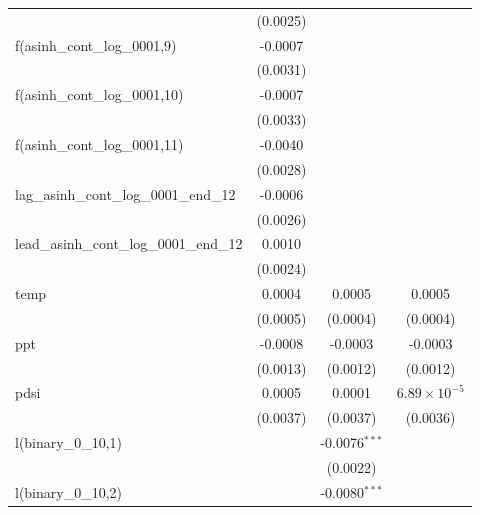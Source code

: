 \begin{tabular}{lccc}
                                               & (0.0025) &                        &   \\   
   f(asinh\_cont\_log\_0001,9)                 & -0.0007  &                        &   \\   
                                               & (0.0031) &                        &   \\   
   f(asinh\_cont\_log\_0001,10)                & -0.0007  &                        &   \\   
                                               & (0.0033) &                        &   \\   
   f(asinh\_cont\_log\_0001,11)                & -0.0040  &                        &   \\   
                                               & (0.0028) &                        &   \\   
   lag\_asinh\_cont\_log\_0001\_end\_12        & -0.0006  &                        &   \\   
                                               & (0.0026) &                        &   \\   
   lead\_asinh\_cont\_log\_0001\_end\_12       & 0.0010   &                        &   \\   
                                               & (0.0024) &                        &   \\   
   temp                                        & 0.0004   & 0.0005                 & 0.0005\\   
                                               & (0.0005) & (0.0004)               & (0.0004)\\   
   ppt                                         & -0.0008  & -0.0003                & -0.0003\\   
                                               & (0.0013) & (0.0012)               & (0.0012)\\   
   pdsi                                        & 0.0005   & 0.0001                 & $6.89\times 10^{-5}$\\    
                                               & (0.0037) & (0.0037)               & (0.0036)\\   
   l(binary\_0\_10,1)                          &          & -0.0076$^{***}$        &   \\   
                                               &          & (0.0022)               &   \\   
   l(binary\_0\_10,2)                          &          & -0.0080$^{***}$        &   \\   

\end{tabular}
